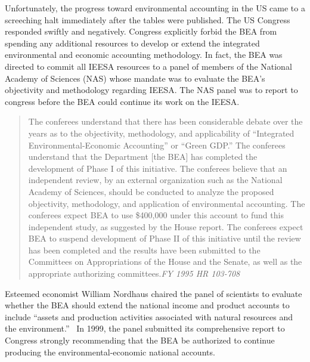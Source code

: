 Unfortunately, the progress toward environmental accounting 
in the US came to a screeching halt immediately after the tables were published. 
The US Congress responded swiftly and negatively. 
Congress explicitly forbid the BEA from spending  
any additional resources to develop or extend
the integrated environmental and economic accounting methodology. 
In fact, the BEA was directed 
to commit all IEESA resources to a panel 
of members of the National Academy of Sciences (NAS)
whose mandate was to evaluate the BEA’s objectivity and methodology 
regarding IEESA. 
The NAS panel was to report to congress before the BEA 
could continue its work on the IEESA.

\begin{quote}
	The conferees understand that there has been considerable debate 
	over the years as to the objectivity, methodology, and applicability 
	of ``Integrated Environmental-Economic Accounting'' or ``Green GDP.''
	The conferees understand that the Department [the BEA]
	has completed the development of Phase I of this initiative. 
	The conferees believe that an independent review, 
	by an external organization such as the National Academy of Sciences, 
	should be conducted to analyze 
	the proposed objectivity, methodology, and application of environmental accounting. 
	The conferees expect BEA to use \$400,000 under this account 
	to fund this independent study, as suggested by the House report. 
	The conferees expect BEA to suspend development 
	of Phase II of this initiative 
	until the review has been completed and the results have been submitted 
	to the Committees on Appropriations of the House and the Senate, 
	as well as the appropriate authorizing committees.\emph{FY 1995 HR 103-708}
\end{quote}

Esteemed economist William Nordhaus chaired the panel of scientists
to evaluate whether the BEA should extend 
the national income and product accounts to include 
``assets and production activities associated 
with natural resources and the environment.''~\cite[p.~2]{Nordhaus1999a} 
In 1999, the panel submitted its comprehensive report 
to Congress strongly recommending that the BEA be authorized 
to continue producing the environmental-economic national accounts.\cite{Nordhaus1999a}

